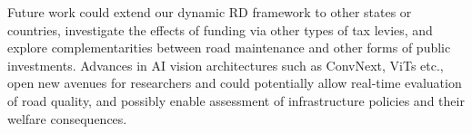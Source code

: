 Future work could extend our dynamic RD framework to other states or countries, investigate the effects of funding via other types of tax levies, and explore complementarities between road maintenance and other forms of public investments. Advances in AI vision architectures such as ConvNext, ViTs etc., open new avenues for researchers and could potentially allow real‐time evaluation of road quality, and possibly enable assessment of infrastructure policies and their welfare consequences.




